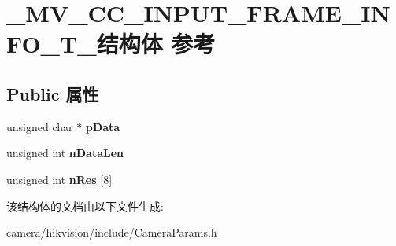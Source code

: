 \hypertarget{struct___m_v___c_c___i_n_p_u_t___f_r_a_m_e___i_n_f_o___t__}{}\section{\+\_\+\+M\+V\+\_\+\+C\+C\+\_\+\+I\+N\+P\+U\+T\+\_\+\+F\+R\+A\+M\+E\+\_\+\+I\+N\+F\+O\+\_\+\+T\+\_\+结构体 参考}
\label{struct___m_v___c_c___i_n_p_u_t___f_r_a_m_e___i_n_f_o___t__}
\subsection*{Public 属性}
\begin{DoxyCompactItemize}
\item 
\mbox{\label{struct___m_v___c_c___i_n_p_u_t___f_r_a_m_e___i_n_f_o___t___a19f127bfc24e0eec919d5c3791c1a16b}} 
unsigned char $\ast$ {\bfseries p\+Data}
\item 
\mbox{\label{struct___m_v___c_c___i_n_p_u_t___f_r_a_m_e___i_n_f_o___t___aecb6c69b222951c61e7e342cfde3ce08}} 
unsigned int {\bfseries n\+Data\+Len}
\item 
\mbox{\label{struct___m_v___c_c___i_n_p_u_t___f_r_a_m_e___i_n_f_o___t___a15de29a5a6b0c074f64969b4bf9769b8}} 
unsigned int {\bfseries n\+Res} \mbox{[}8\mbox{]}
\end{DoxyCompactItemize}


该结构体的文档由以下文件生成\+:\begin{DoxyCompactItemize}
\item 
camera/hikvision/include/Camera\+Params.\+h\end{DoxyCompactItemize}
